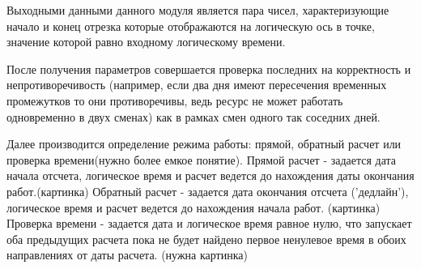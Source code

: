 \newline
Выходными данными данного модуля является пара чисел, характеризующие начало и конец отрезка которые отображаются на логическую ось в точке, значение которой равно входному логическому времени.

После получения параметров совершается проверка последних на корректность и непротиворечивость (например, если два дня имеют пересечения временных промежутков то они противоречивы, ведь ресурс не может работать одновременно в двух сменах) как в рамках смен одного так соседних дней.

Далее производится определение режима работы: прямой, обратный расчет или проверка времени(нужно более емкое понятие).
Прямой расчет - задается дата начала отсчета, логическое время и расчет ведется до нахождения даты окончания работ.(картинка)
Обратный расчет - задается дата окончания отсчета ('дедлайн'), логическое время и расчет ведется до нахождения начала работ. (картинка)
Проверка времени - задается дата и логическое время равное нулю, что запускает оба предыдущих расчета пока не будет найдено первое ненулевое время в обоих направлениях от даты расчета. (нужна картинка)

